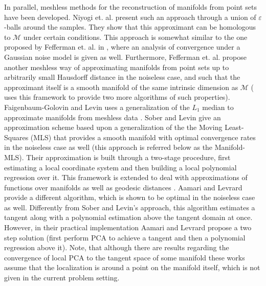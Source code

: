 \documentclass[12pt]{article}
\theoremstyle{remark}
\newcommand{\MM}{\mathcal{M}}
\begin{document}
In parallel, meshless methods for the reconstruction of manifolds from point sets have been developed.
Niyogi et. al. \cite{niyogi2008finding} present such an approach through a union of $\varepsilon$-balls around the samples.
They show that this approximant can be homologous to $\MM$ under certain conditions. 
This approach is somewhat similar to the one proposed by Fefferman et. al. in \cite{fefferman2018fitting}, where an analysis of convergence under a Gaussian noise model is given as well. 
Furthermore, Fefferman et. al. \cite{fefferman2019fitting} %
propose another meshless way of approximating manifolds from point sets up to arbitrarily small Hausdorff distance in the noiseless case, and such that the approximant itself is a smooth manifold of the same intrinsic dimension as $\MM$ (\cite{mohammed2017manifold} uses this framework to provide two more algorithms of such properties).
Faigenbaum-Golovin and Levin uses a generalization of the $L_1$ median to approximate manifolds from meshless data \cite{faigenbaum2020manifold,faigenbaum2025mind}.
Sober and Levin \cite{sober2016MMLS} give an approximation scheme based upon a generalization of the the Moving Least-Squares (MLS) \cite{levin2004mesh,mclain1976two} that provides a smooth manifold with optimal convergence rates in the noiseless case as well (this approach is referred below as the Manifold-MLS).
Their approximation is built through a two-stage procedure, first estimating a local coordinate system and then building a local polynomial regression over it. 
This framework is extended to deal with approximations of functions over manifolds \cite{sober2017approximation} as well as geodesic distances \cite{sober2020Geodesics}.
Aamari and Levrard \cite{aamari2019nonasymptotic} provide a different algorithm, which is shown to be optimal in the noiseless case as well. 
Differently from Sober and Levin's approach, this algorithm estimates a tangent along with a polynomial estimation above the tangent domain at once.
However, in their practical implementation Aamari and Levrard propose a two step solution (first perform PCA to achieve a tangent and then a polynomial regression above it). Note, that although there are results regarding the convergence of local PCA to the tangent space of some manifold these works assume that the localization is around a point on the manifold itself, which is not given in the current problem setting.
\end{document}
